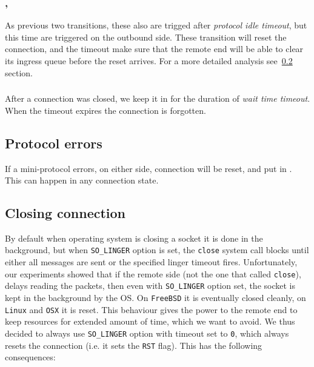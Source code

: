 \subsubsection{\CommitUniLoc{}, \CommitDupLoc{}}\label{sec:tr_commit_loc}
As previous two transitions, these also are trigged after \textit{protocol idle
timeout}, but this time are triggered on the outbound side.  These transition
will reset the connection, and the timeout make sure that the remote end will
be able to clear its ingress queue before the \TCP{} reset arrives.  For a more
detailed analysis see~\ref{sec:connection-close} section.


\subsubsection{\Terminate{}}
After a connection was closed, we keep it in \TerminatingState{} for the
duration of \textit{wait time timeout}.  When the timeout expires the
connection is forgotten.  


\subsection{Protocol errors}
If a mini-protocol errors, on either side, connection will be reset, and put in
\TerminatedState{}. This can happen in any connection state.


\subsection{Closing connection}\label{sec:connection-close}

By default when operating system is closing a socket it is done in the
background, but when \texttt{SO\_LINGER} option is set, the \texttt{close}
system call blocks until either all messages are sent or the specified linger
timeout fires. Unfortunately, our experiments showed that if the remote side
(not the one that called \texttt{close}), delays reading the packets, then even
with \texttt{SO\_LINGER} option set, the socket is kept in the background by
the OS.  On \texttt{FreeBSD} it is eventually closed cleanly, on \texttt{Linux}
and \texttt{OSX} it is reset. This behaviour gives the power to the
remote end to keep resources for extended amount of time, which we want to
avoid. We thus decided to always use \texttt{SO\_LINGER} option with timeout
set to \texttt{0}, which always resets the connection (i.e. it sets the
\texttt{RST} \TCP{} flag). This has the following consequences:

